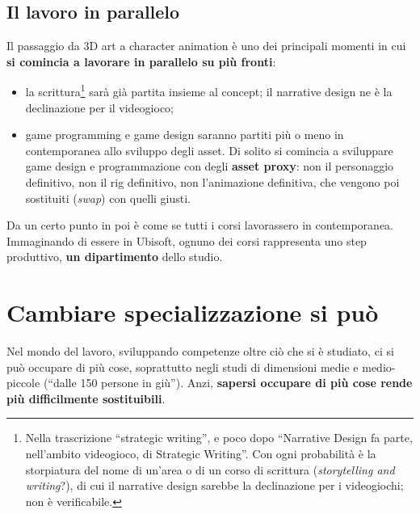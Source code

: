 \subsection{Il lavoro in parallelo}

Il passaggio da 3D art a character animation è uno dei principali momenti in
cui \textbf{si comincia a lavorare in parallelo su più fronti}:
\begin{itemize}
  \item la scrittura\footnote{Nella trascrizione ``strategic writing'', e
        poco dopo ``Narrative Design fa parte, nell'ambito videogioco, di
        Strategic Writing''. Con ogni probabilità è la storpiatura del nome
        di un'area o di un corso di scrittura (\emph{storytelling and
        writing}?), di cui il narrative design sarebbe la declinazione per i
        videogiochi; non è verificabile.} sarà già partita insieme al
        concept; il narrative design ne è la declinazione per il videogioco;
  \item game programming e game design saranno partiti più o meno in
        contemporanea allo sviluppo degli asset. Di solito si comincia a
        sviluppare game design e programmazione con degli \textbf{asset
        proxy}: non il personaggio definitivo, non il rig definitivo, non
        l'animazione definitiva, che vengono poi sostituiti (\emph{swap}) con
        quelli giusti.
\end{itemize}
Da un certo punto in poi è come se tutti i corsi lavorassero in
contemporanea. Immaginando di essere in Ubisoft, ognuno dei corsi rappresenta
uno step produttivo, \textbf{un dipartimento} dello studio.

\section{Cambiare specializzazione si può}
\label{p4:sec:cambiare}

Nel mondo del lavoro, sviluppando competenze oltre ciò che si è studiato, ci
si può occupare di più cose, soprattutto negli studi di dimensioni medie e
medio-piccole (``dalle 150 persone in giù''). Anzi, \textbf{sapersi occupare
di più cose rende più difficilmente sostituibili}.

